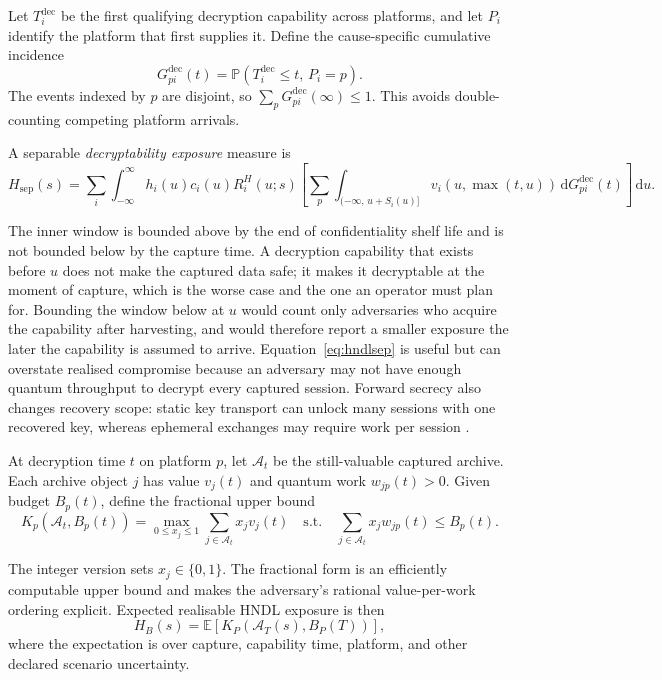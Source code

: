 \documentclass[10pt]{article}
\newcommand{\E}{\mathbb{E}}
\newcommand{\Prb}{\mathbb{P}}
\newcommand{\dd}{\,\mathrm{d}}
\begin{document}
Let $T_i^{\mathrm{dec}}$ be the first qualifying decryption capability across platforms, and let $P_i$ identify the platform that first supplies it. Define the cause-specific cumulative incidence
\begin{equation*}
G_{pi}^{\mathrm{dec}}(t)=\Prb(T_i^{\mathrm{dec}}\le t,\,P_i=p).
\end{equation*}
The events indexed by $p$ are disjoint, so $\sum_pG_{pi}^{\mathrm{dec}}(\infty)\le1$. This avoids double-counting competing platform arrivals.

A separable \emph{decryptability exposure} measure is
\begin{equation}
H_{\mathrm{sep}}(s)=\sum_i\int_{-\infty}^{\infty}
h_i(u)c_i(u)R_i^H(u;s)
\left[\sum_p\int_{(-\infty,\,u+S_i(u)]} v_i\!\left(u,\max(t,u)\right)\dd G_{pi}^{\mathrm{dec}}(t)\right]\dd u.
\label{eq:hndlsep}
\end{equation}

The inner window is bounded above by the end of confidentiality shelf life and is not bounded
below by the capture time. A decryption capability that exists before $u$ does not make the
captured data safe; it makes it decryptable at the moment of capture, which is the worse case and
the one an operator must plan for. Bounding the window below at $u$ would count only adversaries
who acquire the capability after harvesting, and would therefore report a smaller exposure the
later the capability is assumed to arrive.
Equation~\eqref{eq:hndlsep} is useful but can overstate realised compromise because an adversary may not have enough quantum throughput to decrypt every captured session. Forward secrecy also changes recovery scope: static key transport can unlock many sessions with one recovered key, whereas ephemeral exchanges may require work per session \cite{blanco2026}.

At decryption time $t$ on platform $p$, let $\mathcal A_t$ be the still-valuable captured archive. Each archive object $j$ has value $v_j(t)$ and quantum work $w_{jp}(t)>0$. Given budget $B_p(t)$, define the fractional upper bound
\begin{equation}
K_p(\mathcal A_t,B_p(t))=
\max_{0\le x_j\le1}\sum_{j\in\mathcal A_t}x_jv_j(t)
\quad\text{s.t.}\quad
\sum_{j\in\mathcal A_t}x_jw_{jp}(t)\le B_p(t).
\label{eq:knapsack}
\end{equation}

The integer version sets $x_j\in\{0,1\}$. The fractional form is an efficiently computable upper bound and makes the adversary's rational value-per-work ordering explicit. Expected realisable HNDL exposure is then
\begin{equation}
H_B(s)=\E\left[K_P(\mathcal A_T(s),B_P(T))\right],
\label{eq:hndlb}
\end{equation}
where the expectation is over capture, capability time, platform, and other declared scenario uncertainty.
\end{document}
